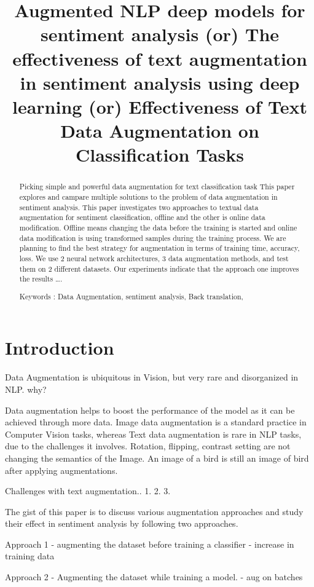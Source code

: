 \documentclass{article}
\title{Augmented NLP deep models for sentiment analysis  (or)  The effectiveness of text augmentation in sentiment analysis using deep learning (or) Effectiveness of Text Data Augmentation on Classification Tasks}
\begin{document}
\maketitle

\begin{abstract}
Picking simple and powerful data augmentation for text classification task
This paper explores and campare multiple solutions to the problem of data augmentation in sentiment analysis.
This paper investigates two approaches to textual data augmentation for sentiment classification, offline and the other is online data modification. 
Offline means changing the data before the training is started and online data modification is using transformed samples during the training process. 
We are planning to find the best strategy for augmentation in terms of training time, accuracy, loss. 
We use 2 neural network architectures, 3 data augmentation methods, and test them on 2 different datasets. 
Our experiments indicate that the approach one improves the results ….


Keywords :  Data Augmentation, sentiment analysis, Back translation,


\end{abstract}

 

\section{Introduction}

Data Augmentation is ubiquitous in Vision, but very rare and disorganized in NLP. why?

Data augmentation helps to boost the performance of the model as it can be achieved through more data.
Image data augmentation is a standard practice in Computer Vision tasks, whereas Text data augmentation is rare in NLP tasks, due to the challenges it involves.
Rotation, flipping, contrast setting are not changing the semantics of the Image. An image of a bird is still an image of bird after applying augmentations.

Challenges with text augmentation..
1.
2.
3. 

The gist of this paper is to discuss various augmentation approaches and study their effect in sentiment analysis by following two approaches.

Approach 1 - augmenting the dataset before training a classifier - increase in training data

Approach 2 - Augmenting the dataset while training a model. - aug on batches
\end{document}
